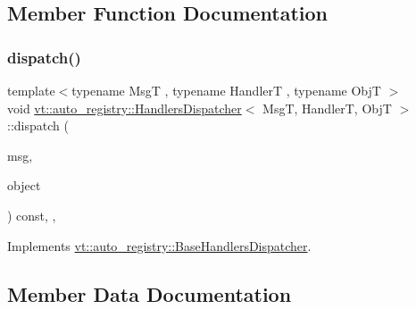 \subsection{Member Function Documentation}
\mbox{\label{structvt_1_1auto__registry_1_1_handlers_dispatcher_a0b335de6d03c14798e01a760f68a0719}} 
\subsubsection{\texorpdfstring{dispatch()}{dispatch()}}
{\footnotesize\ttfamily template$<$typename MsgT , typename HandlerT , typename ObjT $>$ \\
void \hyperlink{structvt_1_1auto__registry_1_1_handlers_dispatcher}{vt\+::auto\+\_\+registry\+::\+Handlers\+Dispatcher}$<$ MsgT, HandlerT, ObjT $>$\+::dispatch (\begin{DoxyParamCaption}\item[{\hyperlink{structvt_1_1messaging_1_1_base_msg}{messaging\+::\+Base\+Msg} $\ast$}]{msg,  }\item[{void $\ast$}]{object }\end{DoxyParamCaption}) const\hspace{0.3cm}{\ttfamily [inline]}, {\ttfamily [override]}, {\ttfamily [virtual]}}



Implements \hyperlink{structvt_1_1auto__registry_1_1_base_handlers_dispatcher_aefc05db879ce57b3ea0295afa56aa819}{vt\+::auto\+\_\+registry\+::\+Base\+Handlers\+Dispatcher}.



\subsection{Member Data Documentation}
\mbox{\label{structvt_1_1auto__registry_1_1_handlers_dispatcher_a2ec99ef68e6c7b37f3e978a100cecb81}} 
